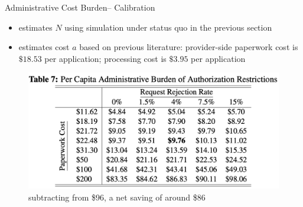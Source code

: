 \begin{frame}{Administrative Cost Burden-- Calibration}
    \begin{itemize}
        \item estimates $N$ using simulation under status quo in the previous section
        \item estimates cost $a$ based on previous literature: provider-side paperwork cost is $\$ 18.53$ per application; processing cost is $\$ 3.95$ per application 
    \end{itemize}
    \begin{figure}
        \centering
        \includegraphics[width=0.7\linewidth]{tb7-admin-cost.png}
        \caption{subtracting from \$96, a net saving of around \$86 }
    \end{figure}
\end{frame}